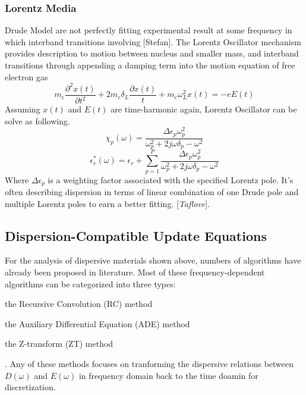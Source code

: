 \subsubsection{Lorentz Media}
Drude Model are not perfectly fitting experimental result at some frequency in which interband transitions involving
[Stefan]. The Lorentz Oscillator mechanism provides description to motion between nucleus and smaller mass, and
interband transitions through appending a damping term into the motion equation of free electron gas
\begin{equation}
    m_e\frac{\partial^2 x(t)}{\partial t^2} + 2m_e\delta_L\frac{\partial x(t)}{t} + m_e\omega_L^2x(t) = -eE(t)
\end{equation}
Assuming $x(t)$ and $E(t)$ are time-harmonic again, Lorentz Oscillator can be solve as following. 
\begin{equation}
  \label{eq:lorentz_chi}
  \chi_p(\omega) = \frac{\Delta\epsilon_p\omega_p^2}{\omega_p^2 + 2j\omega\delta_p - \omega^2}  
\end{equation}
\begin{equation}
  \epsilon_r^*(\omega) = \epsilon_r + \sum_{p=1}^P \frac{\Delta\epsilon_p\omega_p^2}{\omega_p^2 + 2j\omega\delta_p - \omega^2}  
\end{equation}
Where $\Delta\epsilon_p$ is a weighting factor associated with the specified Lorentz pole. It's often describing
dispersion in terms of linear combination of one Drude pole and multiple Lorentz poles to earn a better fitting.
[\textit{Taflove}].



\subsection{Dispersion-Compatible Update Equations}
For the analysis of dispersive materials shown above, numbers of algorithms have already been proposed in literature.
Most of these frequency-dependent algorithms can be categorized into three types:\begin{inparaenum}[(1)]
\item the Recursive Convolution (RC) method
\item the Auxiliary Differential Equation (ADE) method
\item the Z-transform (ZT) method\end{inparaenum}.
Any of these methods focuses on tranforming the dispersive relations between $D(\omega)$ and $E(\omega)$ in frequency
domain back to the time doamin for discretization.



